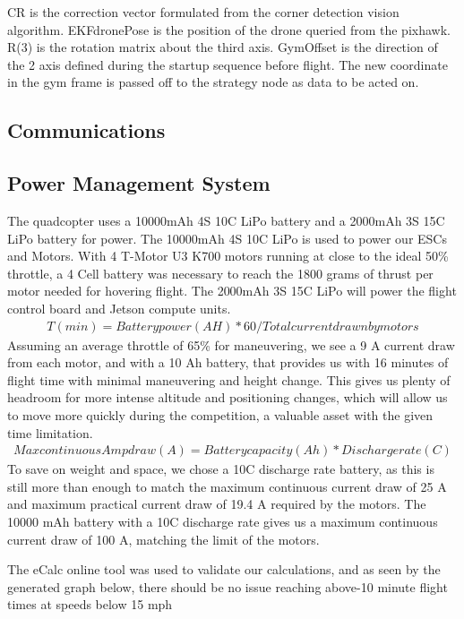 \documentclass[12pt,letterpaper]{article}
\begin{document}
		CR is the correction vector formulated from the corner detection vision algorithm. EKFdronePose is the position of the drone queried from the pixhawk. R(3) is the rotation matrix about the third axis. GymOffset is the direction of the 2 axis defined during the startup sequence before flight. The new coordinate in the gym frame is passed off to the strategy node as data to be acted on. 


	\subsection*{Communications}
	\subsection*{Power Management System}
		The quadcopter uses  a 10000mAh 4S 10C LiPo battery and a 2000mAh 3S 15C LiPo battery for power. The 10000mAh 4S 10C LiPo is used to power our ESCs and Motors. With 4 T-Motor U3 K700 motors running at close to the ideal 50\% throttle, a 4 Cell battery was necessary to reach the 1800 grams of thrust per motor needed for hovering flight. The 2000mAh 3S 15C LiPo will power the flight control board and Jetson compute units.
		\begin{align*}
		T(min)=Battery power(AH)*60/Total current drawn by motors
		\end{align*}
		Assuming an average throttle of 65\% for maneuvering, we see a 9 A current draw from each motor, and with a 10 Ah battery, that provides us with 16 minutes of flight time with minimal maneuvering and height change. This gives us plenty of headroom for more intense altitude and positioning changes, which will allow us to move more quickly during the competition, a valuable asset with the given time limitation. 
		\begin{align*}
		Max continuous Amp draw (A) = Battery capacity (Ah) * Discharge rate (C)
		\end{align*}
		To save on weight and space, we chose a 10C discharge rate battery, as this is still more than enough to match the maximum continuous current draw of 25 A and maximum practical current draw of 19.4 A required by the motors. The 10000 mAh battery with a 10C discharge rate gives us a maximum continuous current draw of 100 A, matching the limit of the motors.

		The eCalc online tool was used to validate our calculations, and as seen by the generated graph below, there should be no issue reaching above-10 minute flight times at speeds below 15 mph
\end{document}
